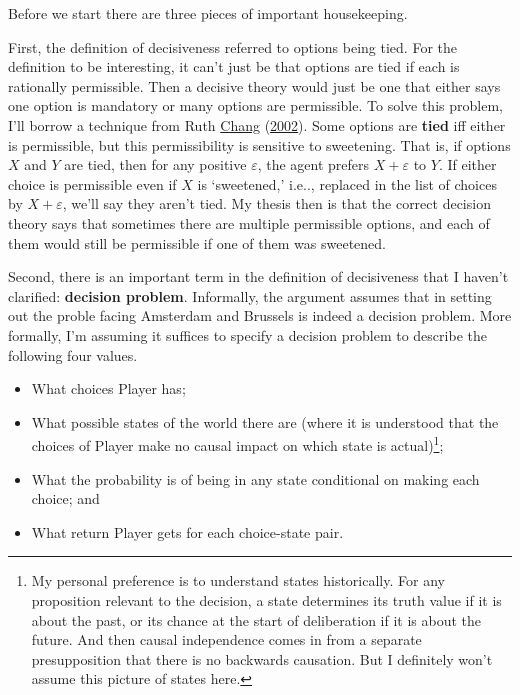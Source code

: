 \documentclass[
  12pt,
]{article}
\providecommand{\tightlist}{%
  \setlength{\itemsep}{0pt}\setlength{\parskip}{0pt}}
\begin{document}
Before we start there are three pieces of important housekeeping.

First, the definition of decisiveness referred to options being tied.
For the definition to be interesting, it can't just be that options are
tied if each is rationally permissible. Then a decisive theory would
just be one that either says one option is mandatory or many options are
permissible. To solve this problem, I'll borrow a technique from Ruth
\protect\hyperlink{ref-Chang2002}{Chang}
(\protect\hyperlink{ref-Chang2002}{2002}). Some options are
\textbf{tied} iff either is permissible, but this permissibility is
sensitive to sweetening. That is, if options \(X\) and \(Y\) are tied,
then for any positive \(\varepsilon\), the agent prefers
\(X + \varepsilon\) to \(Y\). If either choice is permissible even if
\(X\) is `sweetened,' i.e.., replaced in the list of choices by
\(X + \varepsilon\), we'll say they aren't tied. My thesis then is that
the correct decision theory says that sometimes there are multiple
permissible options, and each of them would still be permissible if one
of them was sweetened.

Second, there is an important term in the definition of decisiveness
that I haven't clarified: \textbf{decision problem}. Informally, the
argument assumes that in setting out the proble facing Amsterdam and
Brussels is indeed a decision problem. More formally, I'm assuming it
suffices to specify a decision problem to describe the following four
values.

\begin{itemize}
\tightlist
\item
  What choices Player has;
\item
  What possible states of the world there are (where it is understood
  that the choices of Player make no causal impact on which state is
  actual)\footnote{My personal preference is to understand states
    historically. For any proposition relevant to the decision, a state
    determines its truth value if it is about the past, or its chance at
    the start of deliberation if it is about the future. And then causal
    independence comes in from a separate presupposition that there is
    no backwards causation. But I definitely won't assume this picture
    of states here.};
\item
  What the probability is of being in any state conditional on making
  each choice; and
\item
  What return Player gets for each choice-state pair.
\end{itemize}
\end{document}
